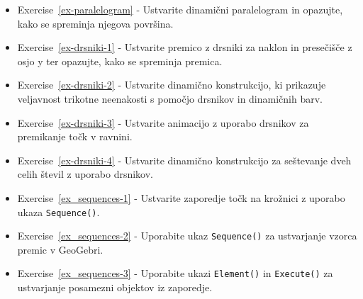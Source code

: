 \begin{itemize}
\item Exercise~\ref{ex-paralelogram} - Ustvarite dinamični paralelogram in opazujte, kako se spreminja njegova površina.
\item Exercise~\ref{ex-drsniki-1} - Ustvarite premico z drsniki za naklon in presečišče z osjo y ter opazujte, kako se spreminja premica.
\item Exercise~\ref{ex-drsniki-2} - Ustvarite dinamično konstrukcijo, ki prikazuje veljavnost trikotne neenakosti s pomočjo drsnikov in dinamičnih barv.
\item Exercise~\ref{ex-drsniki-3} - Ustvarite animacijo z uporabo drsnikov za premikanje točk v ravnini.
\item Exercise~\ref{ex-drsniki-4} - Ustvarite dinamično konstrukcijo za seštevanje dveh celih števil z uporabo drsnikov.
\item Exercise~\ref{ex_sequences-1} - Ustvarite zaporedje točk na krožnici z uporabo ukaza \texttt{Sequence()}.
\item Exercise~\ref{ex_sequences-2} - Uporabite ukaz \texttt{Sequence()} za ustvarjanje vzorca premic v GeoGebri.
\item Exercise~\ref{ex_sequences-3} - Uporabite ukazi \texttt{Element()} in \texttt{Execute()} za ustvarjanje posamezni objektov iz zaporedje.
\end{itemize}




% 
% 
